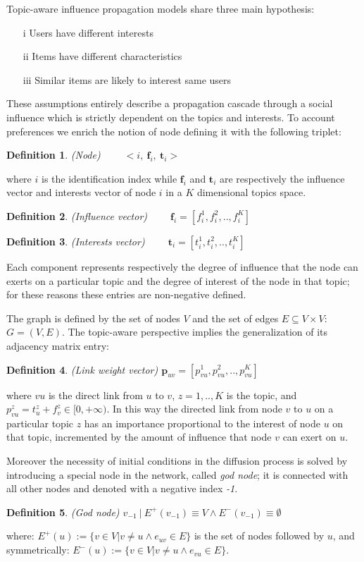 Topic-aware influence propagation models share three main hypothesis: 
\begin{itemize}
\item[i] Users have different interests
\item[ii] Items have different characteristics
\item[iii] Similar items are likely to interest same users
\end{itemize}
These assumptions entirely describe a propagation cascade through a social influence which is  strictly dependent on the topics and interests. To account preferences we enrich the notion of node defining it with the following triplet:
\newtheorem{defn}{Definition}
\begin{defn}
	(Node)  $\qquad <i,\: \mathbf{f}_{i},\: \mathbf{t}_{i}>$
\end{defn}
 where $i$ is the identification index while $\mathbf{f}_{i}$ and $\mathbf{t}_{i}$ are respectively the influence vector and interests vector of node $i$ in a $K$ dimensional topics space.

\begin{defn} 
(Influence vector) $ \qquad \mathbf{f}_i=[f_i^{1}, f_i^{2}, .. , f_i^{K}]$
\end{defn}

\begin{defn}
(Interests vector) $ \qquad \mathbf{t}_i=[t_i^{1}, t_i^{2}, .. , t_i^{K}]  $
\end{defn}
Each component represents respectively the degree of influence that the node can exerts on a particular topic and the degree of interest of the node in that topic; for these reasons these entries are non-negative defined.

The graph is defined by the set of nodes $V$ and the set of edges $E \subseteq V\times V$: $G=(V,E)$. The topic-aware perspective implies the generalization of its adjacency matrix entry:
\begin{defn}
(Link weight vector) $\textbf{p}_{uv} = [p_{vu}^{1}, p_{vu}^{2}, .., p_{vu}^K]$  
\end{defn}
where $vu$ is the direct link from $u$ to $v$, $z=1,..,K$ is the topic, and
 $p_{vu}^{z} = t_u^z + f_v^z \in [0,+\infty)$. In this way the directed link from node $v$ to $u$ on a particular topic $z$ has an importance proportional to the interest of node $u$ on that topic, incremented by the amount of influence that node $v$ can exert on $u$.

Moreover the necessity of initial conditions in the diffusion process is solved by introducing a special node in the network, called \textit{god node}; it is connected with all other nodes and denoted with a negative index \textit{-1}.
\begin{defn}
(God node) $v_{-1}\:|\:E^+(v_{-1})\equiv V \wedge E^-(v_{-1})\equiv\emptyset$
\end{defn}
where: $E^+(u):= \{v \in V | v \neq u \wedge e_{uv} \in E \}$ is the set of nodes followed by $u$, and symmetrically: $E^-(u):= \{v \in V | v \neq u \wedge e_{vu} \in E \}$.


